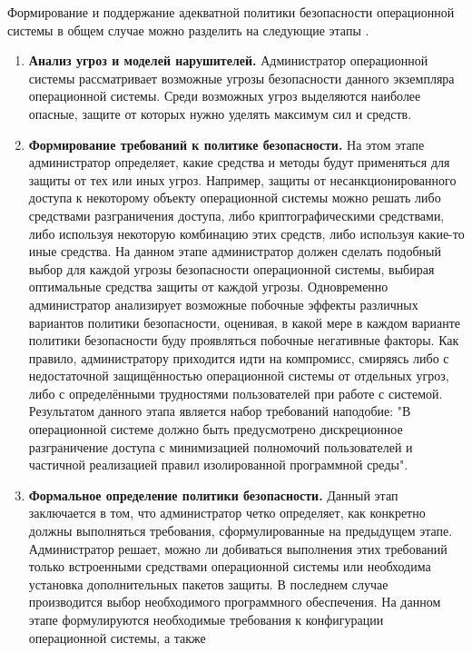 Формирование и поддержание адекватной политики безопасности операционной системы в общем случае
можно разделить на следующие этапы \cite{os-protection}.
\begin{enumerate}
    \item \textbf{Анализ угроз и моделей нарушителей.} Администратор операционной системы рассматривает возможные угрозы
        безопасности данного экземпляра операционной системы. Среди возможных угроз выделяются
        наиболее опасные, защите от которых нужно уделять максимум сил и средств.
    \item \textbf{Формирование требований к политике безопасности.} На этом этапе администратор
        определяет, какие средства и методы будут применяться для защиты от тех или иных угроз.
        Например, защиты от несанкционированного доступа к некоторому объекту операционной системы
        можно решать либо средствами разграничения доступа, либо криптографическими средствами, либо
        используя некоторую комбинацию этих средств, либо используя какие-то иные средства. На данном
        этапе администратор должен сделать подобный выбор для каждой угрозы безопасности операционной
        системы, выбирая оптимальные средства защиты от каждой угрозы. Одновременно администратор
        анализирует возможные побочные эффекты различных вариантов политики безопасности, оценивая,
        в какой мере в каждом варианте политики безопасности буду проявляться побочные негативные
        факторы. Как правило, администратору приходится идти на компромисс, смиряясь либо с
        недостаточной защищённостью операционной системы от отдельных угроз, либо с определёнными
        трудностями пользователей при работе  с системой. Результатом данного этапа является набор
        требований наподобие: "В операционной системе должно быть предусмотрено дискреционное
        разграничение доступа с минимизацией полномочий пользователей и частичной реализацией правил
        изолированной программной среды".
    \item \textbf{Формальное определение политики безопасности.} Данный этап заключается в том, что
        администратор четко определяет, как конкретно должны выполняться требования, сформулированные
        на предыдущем этапе. Администратор решает, можно ли добиваться выполнения этих требований
        только встроенными средствами операционной системы или необходима установка дополнительных
        пакетов защиты. В последнем случае производится выбор необходимого программного обеспечения. На
        данном этапе формулируются необходимые требования к конфигурации операционной системы, а также

\end{enumerate}
